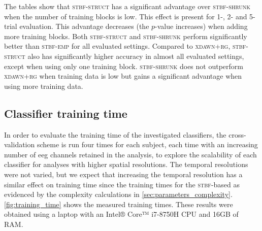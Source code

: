   \begin{table}[p]
		\centering
    \makebox[\textwidth][c]{%
		
  }
    \caption[Statistical significance of differences in classifier performance (1 repetition).]{%
      Statistical significance of differences in classifier performance.
      $p$-values calculated by one-sided paired Wilcoxon rank-sum test with
			Holm correction using one testing trial for different classifiers
			and levels of data availability. $p$-values $<0.05$ are considered significant
			and marked in grey.}
		\label{tab:p_values_1}
    \bigskip

		\centering
    \makebox[\textwidth][c]{%
		
    }
		\caption[Statistical significance of differences in classifier performance (2 repetitions).]{%
      $p$-values as in \cref{tab:p_values_1} averaging over two testing trials.}
		\label{tab:p_values_2}
    \bigskip

		\centering
    \makebox[\textwidth][c]{%
		
    }
    \caption[Statistical significance of differences in classifier performance (5 repetitions).]{%
      $p$-values as in \cref{tab:p_values_1} averaging over five testing trials.}
		\label{tab:p_values_5}
	\end{table}
	\unskip

	The tables show that \textsc{stbf-struct} has a significant advantage over
	\textsc{stbf-shrunk} when the number of training blocks is low.
	This effect is present for 1-, 2- and 5-trial evaluation.
	This advantage decreases (the $p$-value increases) when
	adding more training blocks.
	Both \textsc{stbf-struct} and \textsc{stbf-shrunk} perform significantly better
	than \textsc{stbf-emp} for all evaluated settings.
	Compared to \textsc{xdawn+rg}, \textsc{stbf-struct} also has significantly
	higher accuracy in almost all evaluated settings, except when using only one training block.
	\textsc{stbf-shrunk} does not outperform \textsc{xdawn+rg} when training data is low but gains a significant advantage
	when using more training data.

	\subsection{Classifier training time}
	In order to evaluate the training time of the investigated classifiers, the
	cross-validation scheme is run four times for each subject, each time with an
	increasing number of \ac{eeg} channels retained in the analysis, to explore the scalability of each classifier for analyses with higher spatial resolutions.
	The temporal resolutions were not varied, but we expect that increasing the
	temporal resolution has a similar effect on training time since the
	training times for the \textsc{stbf}-based as evidenced by the complexity
	calculations in \cref{sec:parameters_complexity}.
	\cref{fig:training_time} shows the measured training times.
	These results were obtained using a laptop with an Intel® Core™ i7-8750H CPU and 16GB of RAM.


